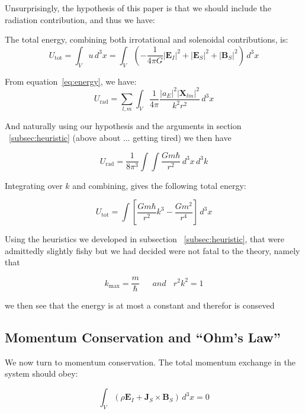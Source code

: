 \documentclass {article}
\renewcommand\vec{\mathbf}
\begin{document}
Unsurprisingly, the hypothesis of this paper is that we should include the radiation contribution, and thus we have:

The total energy, combining both irrotational and solenoidal contributions, is:
\begin{equation}
U_{\text{tot}} = \int_V u \, d^3x = \int_V \left( -\frac{1}{4\pi G} |\vec{E}_I|^2 + |\vec{E}_S|^2 + |\vec{B}_S|^2 \right) \, d^3x
\end{equation}



From equation~\eqref{eq:energy}, we have:
\begin{equation}
U_{\text{rad}} = \sum_{l, m} \int_V \frac{1}{4\pi} \frac{|a_E|^2 |\vec{X}_{lm}|^2}{k^2 r^2} \, d^3x
\end{equation}

And naturally using our hypothesis and the arguments in section  ~\ref{subsec:heuristic} (above about ... getting tired) we then have

\begin{equation}
U_{\text{rad}} =  \frac{1}{8\pi^3} \int \int \frac{Gm \hbar}{r^2} \, d^3x \, d^3k
\end{equation}

Integrating over \(k\) and combining, gives the following total energy:

\begin{equation}
U_{\text{tot}} = \int \left[ \frac{Gm \hbar}{r^2}k^3  - \frac {Gm^2} {r^4}\right] \, d^3x 
\end{equation}


Using the heuristics we developed in subsection ~\ref{subsec:heuristic}, that were admittedly slightly fishy but we had decided were not fatal to the theory, namely that

\begin{equation}
k_{\text{max} }= \frac m {\hbar} ~~~~~~~ and ~~~~ r^2k^2 = 1 
\end{equation}


 we then see that the energy is at most a constant and therefor is conseved 


\subsection{Momentum Conservation and “Ohm’s Law”}

We now turn to momentum conservation. The total momentum exchange in the system should obey:

\begin{equation}
\int_V \left( \rho \vec{E}_I + \vec{J}_S \times \vec{B}_S \right) \, d^3x = 0
\end{equation}
\end{document}
